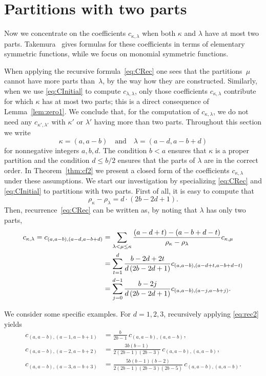 \documentclass[smallextended]{svjour3}
\begin{document}
\section{Partitions with two parts}\label{sec:2parts}

Now we concentrate on the coefficients $c_{\kappa,\lambda}$ when both $\kappa$
and $\lambda$ have at most two parts. Takemura~\cite[\S~4.4]{Takemura}
gives formulas for these coefficients in terms of elementary symmetric
functions, while we focus on monomial symmetric functions.

When applying the recursive formula~\eqref{eq:CRec} one sees that the
partitions~$\mu$ cannot have more parts than~$\lambda$, by the way how they
are constructed. Similarly, when we use \eqref{eq:CInitial} to compute
$c_{\lambda,\lambda}$, only those coefficients $c_{\kappa,\lambda}$ contribute
for which $\kappa$ has at most two parts; this is a direct consequence of
Lemma~\ref{lem:zero1}.  We conclude that, for the computation of
$c_{\kappa,\lambda}$, we do not need any $c_{\kappa',\lambda'}$ with $\kappa'$
or $\lambda'$ having more than two parts.  Throughout this section we write
\[
  \kappa=(a,a-b) \quad\text{and}\quad \lambda=(a-d,a-b+d)
\]
for nonnegative integers $a,b,d$.  The condition $b<a$ ensures that $\kappa$
is a proper partition and the condition $d\leq b/2$ ensures that the
parts of $\lambda$ are in the correct order. In Theorem~\ref{thm:cf2} we
present a closed form of the coefficients $c_{\kappa,\lambda}$ under these
assumptions. We start our investigation by specializing
 \eqref{eq:CRec} and \eqref{eq:CInitial} to partitions with two
parts. First of all, it is easy to compute that 
\[
  \rho_{\kappa}-\rho_{\lambda} = d\cdot(2b-2d+1).
\]
Then, recurrence~\eqref{eq:CRec} can be written as, by noting that
$\lambda$ has only two parts,
\begin{align}\label{eq:rec2}
  c_{\kappa,\lambda} = c_{(a,a-b),(a-d,a-b+d)} &=
  \sum_{\lambda<\mu\leq\kappa}\frac{(a-d+t)-(a-b+d-t)}{\rho_{\kappa}-\rho_{\lambda}} c_{\kappa,\mu} \notag \\
  &= \sum_{t=1}^d\frac{b-2d+2t}{d\,(2b-2d+1)}c_{(a,a-b),(a-d+t,a-b+d-t)} \notag \\ 
  & = \sum_{j=0}^{d-1} \frac{b-2j}{d\,(2b-2d+1)}c_{(a,a-b),(a-j,a-b+j)}. 
\end{align}

\begin{example}\label{ex:twoparts}
We consider some specific examples.  For $d=1,2,3$, recursively applying \eqref{eq:rec2} yields
\allowdisplaybreaks
\begin{align*}
  c_{(a,a-b),(a-1,a-b+1)} &=
    \frac{b}{2b-1}\,c_{(a,a-b),(a,a-b)}, \\
  c_{(a,a-b),(a-2,a-b+2)} &=
\frac{3b(b-1)}{2(2b-1)(2b-3)}\,c_{(a,a-b),(a,a-b)}, \\
  c_{(a,a-b),(a-3,a-b+3)} &=
\frac{5b(b-1)(b-2)}{2(2b-1)(2b-3)(2b-5)}\,c_{(a,a-b),(a,a-b)}.
\end{align*}
\end{example}
\end{document}
